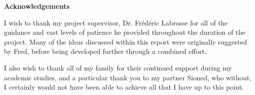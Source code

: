 \thispagestyle{empty}

\begin{center}
    {\LARGE\bf Acknowledgements}
\end{center}

I wish to thank my project supervisor, Dr. Fr\'{e}d\'{e}ric Labrosse for all of the guidance and vast levels of patience he provided throughout the duration of the project. Many of the ideas discussed within this report were originally suggested by Fred, before being developed further through a combined effort.

I also wish to thank all of my family for their continued support during my academic studies, and a particular thank you to my partner Sioned, who without, I certainly would not have been able to achieve all that I have up to this point.